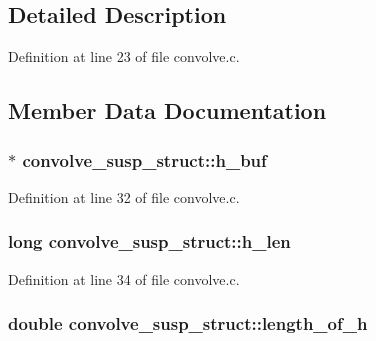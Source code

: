 \subsection{Detailed Description}


Definition at line 23 of file convolve.\+c.



\subsection{Member Data Documentation}
\subsubsection[{\texorpdfstring{h\+\_\+buf}{h_buf}}]{$\ast$ convolve\+\_\+susp\+\_\+struct\+::h\+\_\+buf}\hypertarget{structconvolve__susp__struct_a71aff39b00b05e40d31b0b8865d87c1a}{}\label{structconvolve__susp__struct_a71aff39b00b05e40d31b0b8865d87c1a}


Definition at line 32 of file convolve.\+c.

\subsubsection[{\texorpdfstring{h\+\_\+len}{h_len}}]{\setlength{\rightskip}{0pt plus 5cm}long convolve\+\_\+susp\+\_\+struct\+::h\+\_\+len}\hypertarget{structconvolve__susp__struct_a2d6f6f6a5ab95148e90a4f6a290218cf}{}\label{structconvolve__susp__struct_a2d6f6f6a5ab95148e90a4f6a290218cf}


Definition at line 34 of file convolve.\+c.

\subsubsection[{\texorpdfstring{length\+\_\+of\+\_\+h}{length_of_h}}]{\setlength{\rightskip}{0pt plus 5cm}double convolve\+\_\+susp\+\_\+struct\+::length\+\_\+of\+\_\+h}\hypertarget{structconvolve__susp__struct_a2b6c79d0302b37f2f5b19e9d5871e2cc}{}\label{structconvolve__susp__struct_a2b6c79d0302b37f2f5b19e9d5871e2cc}


